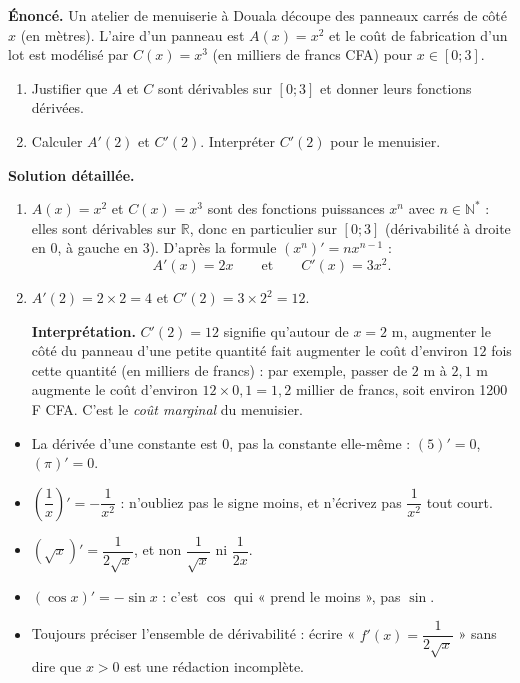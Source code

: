 \documentclass[11pt]{article}
\begin{document}
\begin{exoresolu}
\textbf{Énoncé.} Un atelier de menuiserie à Douala découpe des panneaux carrés de côté $x$ (en mètres). L'aire d'un panneau est $A(x) = x^2$ et le coût de fabrication d'un lot est modélisé par $C(x) = x^3$ (en milliers de francs CFA) pour $x \in [0 ; 3]$.
\begin{enumerate}
\item Justifier que $A$ et $C$ sont dérivables sur $[0 ; 3]$ et donner leurs fonctions dérivées.
\item Calculer $A'(2)$ et $C'(2)$. Interpréter $C'(2)$ pour le menuisier.
\end{enumerate}
\tcblower
\textbf{Solution détaillée.}
\begin{enumerate}
\item $A(x) = x^2$ et $C(x) = x^3$ sont des fonctions puissances $x^n$ avec $n \in \mathbb{N}^*$ : elles sont dérivables sur $\mathbb{R}$, donc en particulier sur $[0 ; 3]$ (dérivabilité à droite en $0$, à gauche en $3$). D'après la formule $\left(x^n\right)' = n x^{n-1}$ :
\[ A'(x) = 2x \qquad \text{et} \qquad C'(x) = 3x^2. \]
\item $A'(2) = 2 \times 2 = 4$ et $C'(2) = 3 \times 2^2 = 12$.

\textbf{Interprétation.} $C'(2) = 12$ signifie qu'autour de $x = 2$ m, augmenter le côté du panneau d'une petite quantité fait augmenter le coût d'environ $12$ fois cette quantité (en milliers de francs) : par exemple, passer de $2$ m à $2{,}1$ m augmente le coût d'environ $12 \times 0{,}1 = 1{,}2$ millier de francs, soit environ 1200 F CFA. C'est le \emph{coût marginal} du menuisier.
\end{enumerate}
\end{exoresolu}

\begin{attention}
\begin{itemize}
\item La dérivée d'une constante est $0$, pas la constante elle-même : $(5)' = 0$, $(\pi)' = 0$.
\item $\left(\dfrac{1}{x}\right)' = -\dfrac{1}{x^2}$ : n'oubliez pas le signe moins, et n'écrivez pas $\dfrac{1}{x^2}$ tout court.
\item $\left(\sqrt{x}\right)' = \dfrac{1}{2\sqrt{x}}$, et non $\dfrac{1}{\sqrt{x}}$ ni $\dfrac{1}{2x}$.
\item $(\cos x)' = -\sin x$ : c'est $\cos$ qui « prend le moins », pas $\sin$.
\item Toujours préciser l'ensemble de dérivabilité : écrire « $f'(x) = \dfrac{1}{2\sqrt{x}}$ » sans dire que $x > 0$ est une rédaction incomplète.
\end{itemize}
\end{attention}
\end{document}
